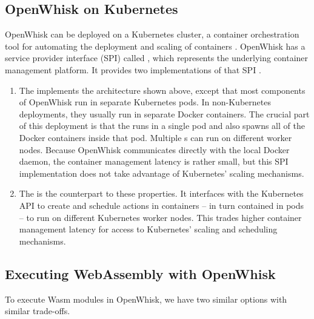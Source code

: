 \subsection{OpenWhisk on Kubernetes}

OpenWhisk can be deployed on a Kubernetes cluster, a container orchestration tool for automating the deployment and scaling of containers \cite{Kub2021}. OpenWhisk has a service provider interface (SPI) called , which represents the underlying container management platform. It provides two implementations of that SPI \cite{OWKub2020}.

\begin{enumerate}
    \item The  implements the architecture shown above, except that most components of OpenWhisk run in separate Kubernetes pods. In non-Kubernetes deployments, they usually run in separate Docker containers. The crucial part of this deployment is that the  runs in a single pod and also spawns all of the Docker containers inside that pod. Multiple s can run on different worker nodes. Because OpenWhisk communicates directly with the local Docker daemon, the container management latency is rather small, but this SPI implementation does not take advantage of Kubernetes' scaling mechanisms.

    \item The  is the counterpart to these properties. It interfaces with the Kubernetes API to create and schedule actions in containers -- in turn contained in pods -- to run on different Kubernetes worker nodes. This trades higher container management latency for access to Kubernetes' scaling and scheduling mechanisms.
\end{enumerate}

\subsection{Executing WebAssembly with OpenWhisk}

To execute Wasm modules in OpenWhisk, we have two similar options with similar trade-offs.

